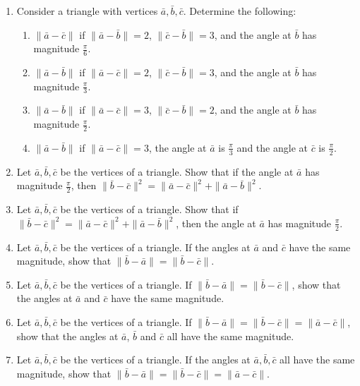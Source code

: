 \begin{exercisebox}
  \begin{enumerate}[resume=AngleEX]  

  \item Consider a triangle with vertices $\bar{a}, \bar{b}, \bar{c}$. Determine the following:
  \begin{enumerate}
    \item $\|\bar{a} - \bar{c}\|$ if $\|\bar{a} - \bar{b}\| = 2$, $\|\bar{c} - \bar{b}\| = 3$, and the angle at $\bar{b}$ has magnitude $\frac{\pi}{6}$.
    \item $\|\bar{a} - \bar{b}\|$ if $\|\bar{a} - \bar{c}\| = 2$, $\|\bar{c} - \bar{b}\| = 3$, and the angle at $\bar{b}$ has magnitude $\frac{\pi}{3}$.
    \item $\|\bar{a} - \bar{b}\|$ if $\|\bar{a} - \bar{c}\| = 3$, $\|\bar{c} - \bar{b}\| = 2$, and the angle at $\bar{b}$ has magnitude $\frac{\pi}{2}$.
    \item $\|\bar{a} - \bar{b}\|$ if $\|\bar{a} - \bar{c}\| = 3$, the angle at $\bar{a}$ is $\frac{\pi}{3}$ and the angle at $\bar{c}$ is $\frac{\pi}{2}$.
  \end{enumerate}

  \item Let $\bar{a}, \bar{b}, \bar{c}$ be the vertices of a triangle. Show that if the angle at $\bar{a}$ has magnitude $\frac{\pi}{2}$, then $\|\bar{b} - \bar{c}\|^2 = \|\bar{a} - \bar{c}\|^2 + \|\bar{a} - \bar{b}\|^2$.

  \item Let $\bar{a}, \bar{b}, \bar{c}$ be the vertices of a triangle. Show that if $\|\bar{b} - \bar{c}\|^2 = \|\bar{a} - \bar{c}\|^2 + \|\bar{a} - \bar{b}\|^2$, then the angle at $\bar{a}$ has magnitude $\frac{\pi}{2}$.

  \item Let $\bar{a}, \bar{b}, \bar{c}$ be the vertices of a triangle. If the angles at $\bar{a}$ and $\bar{c}$ have the same magnitude, show that $\|\bar{b} - \bar{a}\| = \|\bar{b} - \bar{c}\|$.

  \item Let $\bar{a}, \bar{b}, \bar{c}$ be the vertices of a triangle. If $\|\bar{b} - \bar{a}\| = \|\bar{b} - \bar{c}\|$, show that the angles at $\bar{a}$ and $\bar{c}$ have the same magnitude.

  \item Let $\bar{a}, \bar{b}, \bar{c}$ be the vertices of a triangle. If $\|\bar{b} - \bar{a}\| = \|\bar{b} - \bar{c}\| = \|\bar{a} - \bar{c}\|$, show that the angles at $\bar{a}$, $\bar{b}$ and $\bar{c}$ all have the same magnitude.

  \item Let $\bar{a}, \bar{b}, \bar{c}$ be the vertices of a triangle. If the angles at $\bar{a}, \bar{b}, \bar{c}$ all have the same magnitude, show that $\|\bar{b} - \bar{a}\| = \|\bar{b} - \bar{c}\| = \|\bar{a} - \bar{c}\|$.
\end{enumerate}
\end{exercisebox}
